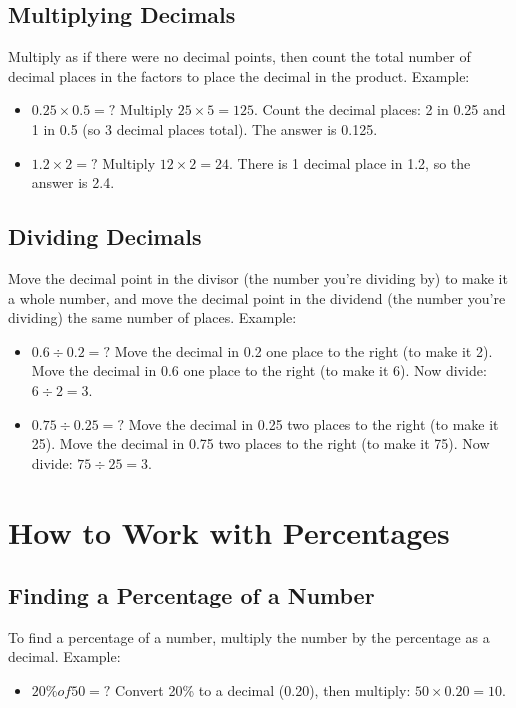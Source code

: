 \subsection{Multiplying Decimals}
Multiply as if there were no decimal points, then count the total number of decimal places in the factors to place the decimal in the product. Example:
\begin{itemize}
    \item $0.25 \times 0.5 = ?$ Multiply $25 \times 5 = 125$. Count the decimal places: 2 in 0.25 and 1 in 0.5 (so 3 decimal places total). The answer is 0.125.
    \item $1.2 \times 2 = ?$ Multiply $12 \times 2 = 24$. There is 1 decimal place in 1.2, so the answer is 2.4.
\end{itemize}

\subsection{Dividing Decimals}
Move the decimal point in the divisor (the number you're dividing by) to make it a whole number, and move the decimal point in the dividend (the number you're dividing) the same number of places. Example:
\begin{itemize}
    \item $0.6 \div 0.2 = ?$ Move the decimal in 0.2 one place to the right (to make it 2). Move the decimal in 0.6 one place to the right (to make it 6). Now divide: $6 \div 2 = 3$.
    \item $0.75 \div 0.25 = ?$ Move the decimal in 0.25 two places to the right (to make it 25). Move the decimal in 0.75 two places to the right (to make it 75). Now divide: $75 \div 25 = 3$.
\end{itemize}

\section{How to Work with Percentages}
\subsection{Finding a Percentage of a Number}
To find a percentage of a number, multiply the number by the percentage as a decimal. Example:
\begin{itemize}
    \item $20\% of 50 = ?$ Convert 20\% to a decimal (0.20), then multiply: $50 \times 0.20 = 10$.
\end{itemize}

